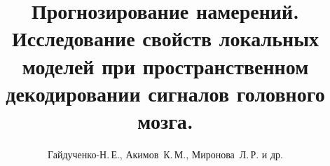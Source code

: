 \documentclass[12pt,twoside]{article}
\title
    [Обнаружение текста]
    {\textbf{Прогнозирование намерений. Исследование свойств локальных моделей при пространственном декодировании сигналов головного мозга.}}
\author
    {Гайдученко-Н.\,Е., Акимов~К.\,М., Миронова~Л.\,Р. и др.}
\begin{document}
\maketitle
\bigskip
\bigskip
\bigskip
\bigskip
\bigskip
\maketitleSecondary
\end{document}
